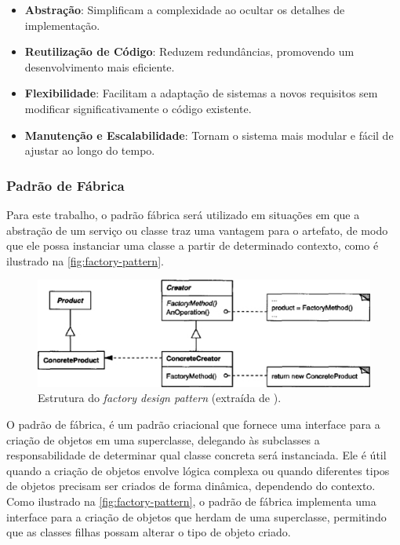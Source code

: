 \documentclass[a4paper, 12pt]{article}
\newcommand{\citeb}[1]{\bibleftbracket\cite{#1}\bibrightbracket}
\begin{document}
    \begin{itemize}
        \item \textbf{Abstração}: Simplificam a complexidade ao ocultar os detalhes de implementação.
        \item \textbf{Reutilização de Código}: Reduzem redundâncias, promovendo um desenvolvimento mais eficiente.
        \item \textbf{Flexibilidade}: Facilitam a adaptação de sistemas a novos requisitos sem modificar significativamente o código existente.
        \item \textbf{Manutenção e Escalabilidade}: Tornam o sistema mais modular e fácil de ajustar ao longo do tempo.
    \end{itemize}
    
    \subsubsection{Padrão de Fábrica} \label{sec:factory_pattern}

    Para este trabalho, o padrão fábrica será utilizado em situações em que a abstração de um serviço ou classe traz uma vantagem para o artefato, de modo que ele possa instanciar uma classe a partir de determinado contexto, como é ilustrado na \autoref{fig:factory-pattern}.
    
    \begin{figure}[ht]
        \includegraphics[width=\textwidth,height=0.9\textheight,keepaspectratio]{images/factory-design-pattern.jpg}
        \centering
        \caption{Estrutura do \textit{factory design pattern} (extraída de \citeb{design_patterns}).}
        \centering
        \label{fig:factory-pattern}
    \end{figure}
    
    O padrão de fábrica, é um padrão criacional que fornece uma interface para a criação de objetos em uma superclasse, delegando às subclasses a responsabilidade de determinar qual classe concreta será instanciada. Ele é útil quando a criação de objetos envolve lógica complexa ou quando diferentes tipos de objetos precisam ser criados de forma dinâmica, dependendo do contexto. Como ilustrado na \autoref{fig:factory-pattern}, o padrão de fábrica implementa uma interface para a criação de objetos que herdam de uma superclasse, permitindo que as classes filhas possam alterar o tipo de objeto criado. 
\end{document}
